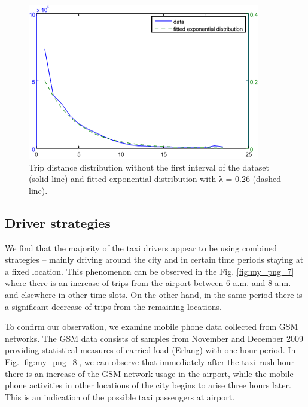 \documentclass[a4paper, 10pt, conference]{ieeeconf}      %
\begin{document}
\begin{figure}[htbp]
    \centering
    \includegraphics{fig/png6.png}
    \caption{Trip distance distribution without the first interval of the dataset (solid line) and fitted exponential distribution with λ = 0.26 (dashed line).}
    \label{fig:my_png_6}
\end{figure}

\subsection{Driver strategies} We find that the majority of the taxi drivers appear to be using combined strategies – mainly driving around the city and in certain time periods staying at a fixed location. This phenomenon can be observed in the Fig. \ref{fig:my_png_7} where there is an increase of trips from the airport between 6 a.m. and 8 a.m. and elsewhere in other time slots. On the other hand, in the same period there is a significant decrease of trips from the remaining locations.  


To confirm our observation, we examine mobile phone data collected from GSM networks. The GSM data consists of samples from November and December 2009 providing statistical measures of carried load (Erlang) with one-hour period. In Fig. \ref{fig:my_png_8}, we can observe that immediately after the taxi rush hour there is an increase of the GSM network usage in the airport, while the mobile phone activities in other locations of the city begins to arise three hours later. This is an indication of the possible taxi passengers at airport. 
\end{document}
